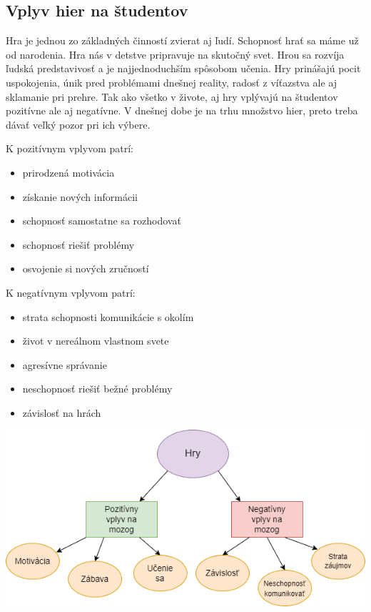 \documentclass[10pt,twoside,slovak,a4paper]{article}
\begin{document}
\subsection{Vplyv hier na študentov} \label{Vplyv}



Hra je jednou zo základných činností zvierat aj ľudí. Schopnosť hrať sa máme už od narodenia. Hra nás v detstve pripravuje na skutočný svet. Hrou sa rozvíja ľudská predstavivosť a je najjednoduchším spôsobom učenia. Hry prinášajú pocit uspokojenia, únik pred problémami dnešnej reality, radosť z víťazstva ale aj sklamanie pri prehre.  Tak ako všetko v živote, aj hry vplývajú na študentov pozitívne ale aj negatívne. V dnešnej dobe je na trhu množstvo hier, preto treba dávať veľký pozor pri ich výbere.

\vspace{5mm}
K pozitívnym vplyvom patrí: 

\begin{itemize}
\item prirodzená motivácia
\item získanie nových informácii
\item schopnosť samostatne sa rozhodovať
\item schopnosť riešiť problémy
\item osvojenie si nových zručností
\end{itemize}

\vspace{5mm}
K negatívnym vplyvom patrí: 

\begin{itemize}
\item strata schopnosti komunikácie s okolím
\item život v nereálnom vlastnom svete
\item agresívne správanie
\item neschopnosť riešiť bežné problémy
\item závislosť na hrách
\end{itemize}


\includegraphics[scale=0.5]{vplyv_na_mozog.drawio.png}
\end{document}

